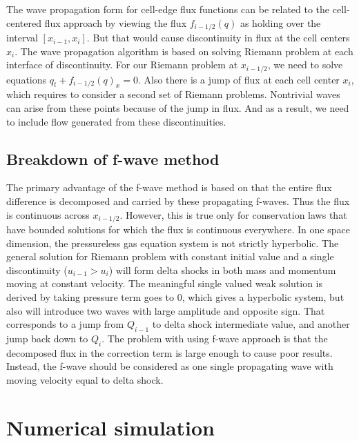 \documentclass{article}
\begin{document}
	\noindent The wave propagation form for cell-edge flux functions can be related to the cell-centered flux approach by viewing the flux $f_{i-1/2}(q)$ as holding over the interval $[x_{i-1},x_i]$. But that would cause discontinuity in flux at the cell centers $x_i$. The wave propagation algorithm is based on solving Riemann problem at each interface of discontinuity. For our Riemann problem at $x_{i-1/2}$, we need to solve equations $q_t+f_{i-1/2}(q)_x=0$. Also there is a jump of flux at each cell center $x_i$, which requires to consider a second set of Riemann problems. Nontrivial waves can arise from these points because of the jump in flux. And as a result, we need to include flow generated from these discontinuities.
\subsection{Breakdown of f-wave method}
The primary advantage of the f-wave method is based on that the entire flux difference is decomposed and carried by these propagating f-waves. Thus the flux is continuous across $x_{i-1/2}$. However, this is true only for conservation laws that have bounded solutions for which the flux is continuous everywhere. In one space dimension, the pressureless gas equation system is not strictly hyperbolic. The general solution for Riemann problem with constant initial value and a single discontinuity ($u_{i-1}>u_{i}$) will form delta shocks in both mass and momentum moving at constant velocity. The meaningful single valued weak solution is derived by taking pressure term goes to $0$, which gives a hyperbolic system, but also will introduce two waves with large amplitude and opposite sign. That corresponds to a jump from $Q_{i-1}$ to delta shock intermediate value, and another jump back down to $Q_{i}$. The problem with using f-wave approach is that the decomposed flux in the correction term is large enough to cause poor results. Instead, the f-wave should be considered as one single propagating wave with moving velocity equal to delta shock.
	
\section{Numerical simulation}
\end{document}
